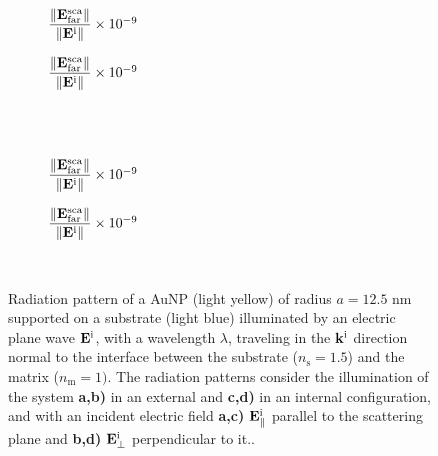 \begin{figure}[t!]
    \centering
    \def\svgwidth{.8\textwidth}
    \hspace*{-.215\textwidth}%
    \vspace*{-.5em}%
        \begin{subfigure}{.32\textwidth}\caption{\footnotesize$\dfrac{\norm{\vb{E}^\text{sca}_\text{far}}}{\norm{\vb{E}^\text{i}}} \times 10^{-9}$  }\label{sfig:Far:Sup:Norm:a}\end{subfigure}%
        \begin{subfigure}{.4\textwidth}\caption{\footnotesize$\dfrac{\norm{\vb{E}^\text{sca}_\text{far}}}{\norm{\vb{E}^\text{i}}} \times 10^{-9}$  }\label{sfig:Far:Sup:Norm:b}\end{subfigure}\\
    \\
    \def\svgwidth{.8\textwidth}
    \hspace*{-.215\textwidth}%
    \vspace*{-.5em}%
        \begin{subfigure}{.32\textwidth}\caption{\footnotesize$\dfrac{\norm{\vb{E}^\text{sca}_\text{far}}}{\norm{\vb{E}^\text{i}}} \times 10^{-9}$  }\label{sfig:Far:Sup:Norm:c}\end{subfigure}%
        \begin{subfigure}{.4\textwidth}\caption{\footnotesize$\dfrac{\norm{\vb{E}^\text{sca}_\text{far}}}{\norm{\vb{E}^\text{i}}} \times 10^{-9}$  }\label{sfig:Far:Sup:Norm:d}\end{subfigure}\\
    \caption[  Radiation pattern of a AuNP supported into a substrate illuminated at normal incidence ]{Radiation pattern of a AuNP (light yellow) of radius $a = 12.5$ nm supported on a substrate (light blue) illuminated by an electric plane wave $\vb{E}^\text{i}$, with a wavelength $\lambda$, traveling in the $\vb{k}^\text{i}$ direction normal to the interface between the substrate ($n_\text{s} = 1.5$) and the matrix ($n_\text{m} = 1)$. The radiation patterns consider the illumination of the system  \textbf{a,b)} in an external and  \textbf{c,d)} in an internal configuration, and with an incident electric field \textbf{a,c)}  $\vb{E}^\text{i}_\parallel$ parallel to the scattering plane and \textbf{b,d)} $\vb{E}^\text{i}_\perp$ perpendicular to it..}
    \label{fig:Far:Sup:Norm}
\end{figure}

